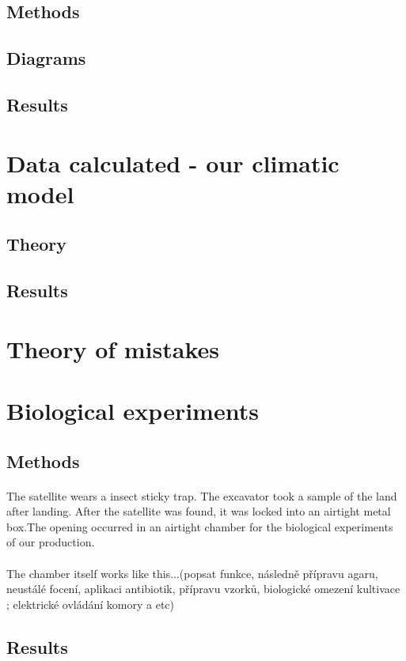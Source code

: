\documentclass{aa}
\begin{document}
\subsection{Methods}
\subsection{Diagrams}
\subsection{Results}
\section{Data calculated - our climatic model}
\subsection{Theory}
\subsection{Results}
\section{Theory of mistakes}
\section{Biological experiments}
\subsection{Methods}
\paragraph{}
The satellite wears a insect sticky trap. The excavator took a sample of the land after landing. After the satellite was found, it was locked into an airtight metal box.The opening occurred in an airtight chamber for the biological experiments of our production.
\paragraph{}
The chamber itself works like this...(popsat funkce, následně přípravu agaru, neustálé focení, aplikaci antibiotik, přípravu vzorků, biologické omezení kultivace ; elektrické ovládání komory a etc)
\subsection{Results}
\end{document}
